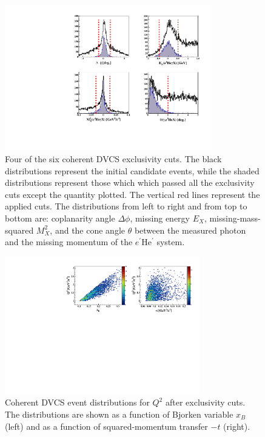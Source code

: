 \documentclass[twocolumn,nofootinbib,showpacs,prl,superscriptaddress,secnumarabic,amssymb,nobibnotes,aps,floatfix]{revtex4}
\begin{document}
\begin{figure}[tb]
\includegraphics[width=9cm]{figs/coh_exc_cuts.pdf}
\caption{Four of the six coherent DVCS exclusivity cuts. The black 
distributions represent the initial candidate events, while the shaded 
distributions represent those which which passed all the exclusivity cuts except 
the quantity plotted. The vertical red lines represent the applied cuts.
The distributions from left to right and from top to bottom are: coplanarity 
angle $\Delta \phi$, missing energy $E_X$, missing-mass-squared $M_X^2$, and 
the cone angle $\theta$ between the measured photon and the missing momentum 
of the $e^\prime$He$^\prime$ system.}
\label{fig:kin-cuts}
\end{figure}
 

\begin{figure}[tb]
\hspace{-0.45cm}
\includegraphics[width=8.5cm]{figs/Q2_xB_t_Coh.pdf}
\caption{Coherent DVCS event distributions for $Q^2$ after exclusivity cuts. 
The distributions are shown as a function of Bjorken variable $x_B$ (left) 
and as a function of squared-momentum transfer $-t$ (right).}
\label{fig:kin-coverage}
\end{figure}
\end{document}
